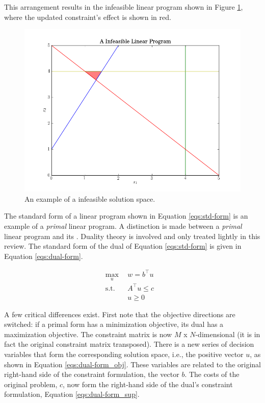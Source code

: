 This arrangement results in the infeasible linear program shown in
Figure \ref{fig:infeasible}, where the updated constraint's effect is shown in
red.

\begin{figure}[H]
  \begin{center}
    \includegraphics[width=\linewidth]{./chapters/litreview/plots/infeasible.png}
  \caption{An example of a infeasible solution space.}
  \label{fig:infeasible}
  \end{center}
\end{figure}

The standard form of a linear program shown in Equation \ref{eqs:std-form} is an
example of a \textit{primal} linear program. A distinction is made between
a \textit{primal} linear program and its . Duality theory is involved
and only treated lightly in this review. The standard form of the dual of
Equation \ref{eqs:std-form} is given in Equation \ref{eqs:dual-form}.

\begin{subequations}\label{eqs:dual-form}
  \begin{align}
    \max_{u} \:\: & 
    w = b^{\top} u
    & \label{eqs:dual-form_obj} \\
    \text{s.t.} \:\: &
    A^{\top} u \leq c 
    & \label{eqs:dual-form_sup} \\
    &
    u \geq 0
    &\label{eqs:dual-form_x}
  \end{align}
\end{subequations}

A few critical differences exist. First note that the objective directions are
switched: if a primal form has a minimization objective, its dual has a
maximization objective. The constraint matrix is now $M$ x $N$-dimensional (it
is in fact the original constraint matrix transposed). There is a new series of
decision variables that form the corresponding solution space, i.e., the
positive vector $u$, as shown in Equation \ref{eqs:dual-form_obj}. These
variables are related to the original right-hand side of the constraint
formulation, the vector $b$. The costs of the original problem, $c$, now form
the right-hand side of the dual's constraint formulation,
Equation \ref{eqs:dual-form_sup}.

